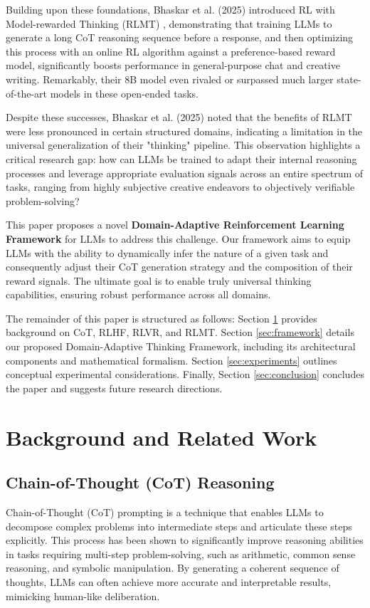 \documentclass{article}
\begin{document}
Building upon these foundations, Bhaskar et al. (2025) introduced RL with Model-rewarded Thinking (RLMT) \cite{bhaskar2025language}, demonstrating that training LLMs to generate a long CoT reasoning sequence before a response, and then optimizing this process with an online RL algorithm against a preference-based reward model, significantly boosts performance in general-purpose chat and creative writing. Remarkably, their 8B model even rivaled or surpassed much larger state-of-the-art models in these open-ended tasks.

Despite these successes, Bhaskar et al. (2025) noted that the benefits of RLMT were less pronounced in certain structured domains, indicating a limitation in the universal generalization of their "thinking" pipeline. This observation highlights a critical research gap: how can LLMs be trained to adapt their internal reasoning processes and leverage appropriate evaluation signals across an entire spectrum of tasks, ranging from highly subjective creative endeavors to objectively verifiable problem-solving?

This paper proposes a novel \textbf{Domain-Adaptive Reinforcement Learning Framework} for LLMs to address this challenge. Our framework aims to equip LLMs with the ability to dynamically infer the nature of a given task and consequently adjust their CoT generation strategy and the composition of their reward signals. The ultimate goal is to enable truly universal thinking capabilities, ensuring robust performance across all domains.

The remainder of this paper is structured as follows: Section \ref{sec:background} provides background on CoT, RLHF, RLVR, and RLMT. Section \ref{sec:framework} details our proposed Domain-Adaptive Thinking Framework, including its architectural components and mathematical formalism. Section \ref{sec:experiments} outlines conceptual experimental considerations. Finally, Section \ref{sec:conclusion} concludes the paper and suggests future research directions.

\section{Background and Related Work}
\label{sec:background}

\subsection{Chain-of-Thought (CoT) Reasoning}
Chain-of-Thought (CoT) prompting \cite{wei2022chain} is a technique that enables LLMs to decompose complex problems into intermediate steps and articulate these steps explicitly. This process has been shown to significantly improve reasoning abilities in tasks requiring multi-step problem-solving, such as arithmetic, common sense reasoning, and symbolic manipulation. By generating a coherent sequence of thoughts, LLMs can often achieve more accurate and interpretable results, mimicking human-like deliberation.
\end{document}
